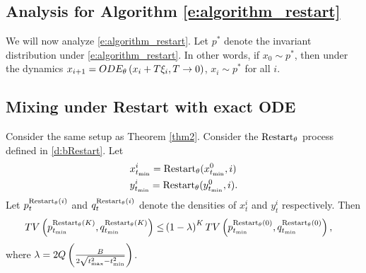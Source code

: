 \subsection{Analysis for Algorithm \eqref{e:algorithm_restart}}
We will now analyze \eqref{e:algorithm_restart}. Let $p^*$ denote the invariant distribution under \eqref{e:algorithm_restart}. In other words, if $x_0 \sim p^*$, then under the dynamics $x_{i+1} = ODE_{\theta}\left( x_i + T\xi_i, T \to 0 \right)$, $x_i \sim p^*$ for all $i$.
\fi


\subsection{Mixing under Restart with exact ODE}


\begin{lemma}
    \label{l:restart_tv_convergence}
    Consider the same setup as Theorem \ref{thm2}. Consider the ${\textrm{Restart}_\theta}$ process defined in \eqref{d:bRestart}. Let
    \begin{align*}
        & x^{i}_{t_{\textrm{min}}} = {\textrm{Restart}_\theta}(x^0_{t_{\textrm{min}}}, i)\\
        & y^{i}_{t_{\textrm{min}}} = {\textrm{Restart}_\theta}(y^0_{t_{\textrm{min}}}, i).
    \end{align*}
    Let $p^{{\textrm{Restart}_\theta}(i)}_{t}$ and $q^{{\textrm{Restart}_\theta}(i)}_{t}$ denote the densities of $x^i_t$ and $y^i_t$ respectively. Then 
    \begin{align*}
        TV\left( p^{{\textrm{Restart}_\theta}(K)}_{t_{\textrm{min}}},q^{{\textrm{Restart}_\theta}(K)}_{t_{\textrm{min}}} \right)
        \leq& \left( 1-\lambda \right)^K TV\left( p^{{\textrm{Restart}_\theta}(0)}_{t_{\textrm{min}}},q^{{\textrm{Restart}_\theta}(0)}_{t_{\textrm{min}}} \right),
    \end{align*}
    where $\lambda = 2Q\left( \frac{B}{{2\sqrt{t_{\textrm{max}}^2 - t_{\textrm{min}}^2}}} \right)$. 
\end{lemma}

